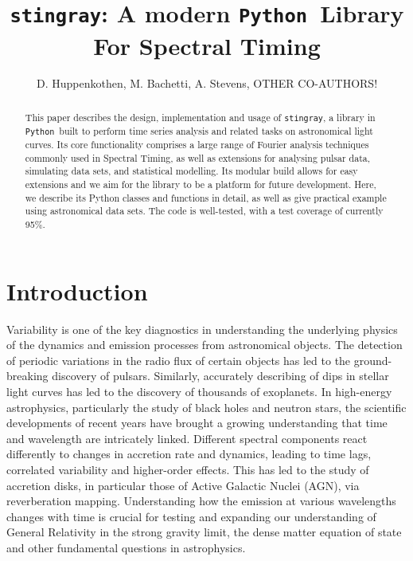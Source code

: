 \documentclass[12pt]{emulateapj}
\newcommand{\stingray}{\texttt{stingray}}
\newcommand{\python}{\texttt{Python}}
\begin{document}
\title{\stingray: A modern \python\ Library For Spectral Timing}

\author{D. Huppenkothen, M. Bachetti, A. Stevens\altaffilmark{}, OTHER CO-AUTHORS!}
 
\altaffiltext{}{}
\altaffiltext{}{}


\begin{abstract}
This paper describes the design, implementation and usage of \stingray, a library in \python\ built to perform time series analysis and related tasks on astronomical light curves. Its core functionality comprises a large range of Fourier analysis techniques commonly used in Spectral Timing, as well as extensions for analysing pulsar data, simulating data sets, and statistical modelling. Its modular build allows for easy extensions and we aim for the library to be a platform for future development. Here, we describe its Python classes and functions in detail, as well as give practical example using astronomical data sets. The code is well-tested, with a test coverage of currently 95\%.

\end{abstract}


\section{Introduction}

Variability is one of the key diagnostics in understanding the underlying physics of the dynamics and emission processes from astronomical objects. The detection of periodic variations in the radio flux of certain objects has led to the ground-breaking discovery of pulsars. Similarly, accurately describing of dips in stellar light curves has led to the discovery of thousands of exoplanets. In high-energy astrophysics, particularly the study of black holes and neutron stars, the scientific developments of recent years have brought a growing understanding that time and wavelength are intricately linked. Different spectral components react differently to changes in accretion rate and dynamics, leading to time lags, correlated variability and higher-order effects. This has led to the study of accretion disks, in particular those of Active Galactic Nuclei (AGN), via reverberation mapping. Understanding how the emission at various wavelengths changes with time is crucial for testing and expanding our understanding of General Relativity in the strong gravity limit, the dense matter equation of state and other fundamental questions in astrophysics.
\end{document}
